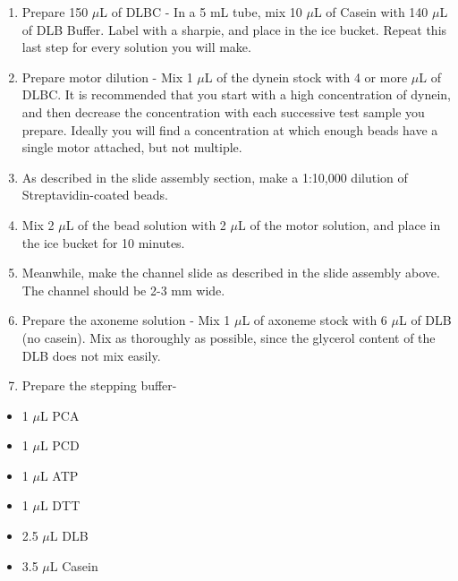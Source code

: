 \documentclass{../lab}
\begin{document}
\begin{enumerate}
    \item Prepare 150 $ \mu $L of DLBC - In a 5 mL tube, mix 10 $ \mu $L of Casein with 140 $ \mu $L of DLB Buffer. Label with a sharpie, and place in the ice bucket. Repeat this last step for every solution you will make.

    \item Prepare motor dilution - Mix 1 $ \mu $L of the dynein stock with 4 or more $ \mu $L of DLBC. It is recommended that you start with a high concentration of dynein, and then decrease the concentration with each successive test sample you prepare. Ideally you will find a concentration at which enough beads have a single motor attached, but not multiple.

    \item As described in the slide assembly section, make a 1:10,000 dilution of Streptavidin-coated beads.

    \item Mix 2 $ \mu $L of the bead solution with 2 $ \mu $L of the motor solution, and place in the ice bucket for 10 minutes.

    \item Meanwhile, make the channel slide as described in the slide assembly above. The channel should be 2-3 mm wide.

    \item Prepare the axoneme solution - Mix 1 $ \mu $L of axoneme stock with 6 $ \mu $L of DLB (no casein). Mix as thoroughly as possible, since the glycerol content of the DLB does not mix easily.

    \item Prepare the stepping buffer-

\end{enumerate}

\begin{itemize}
    \item 1 $ \mu $L PCA

    \item 1 $ \mu $L PCD

    \item 1 $ \mu $L ATP

    \item 1 $ \mu $L DTT

    \item 2.5 $ \mu $L DLB

    \item 3.5 $ \mu $L Casein

\end{itemize}
\end{document}
